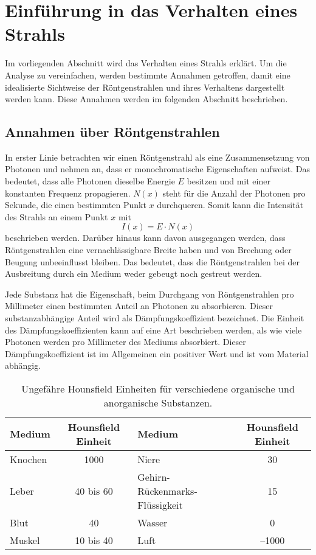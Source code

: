 %
%
%
%
\section{Einführung in das Verhalten eines Strahls
	\label{ct:section:EinführungEinesStrahls}}
Im vorliegenden Abschnitt wird das Verhalten eines Strahls erklärt. Um die Analyse zu vereinfachen, werden bestimmte Annahmen getroffen, damit eine idealisierte Sichtweise der Röntgenstrahlen und ihres Verhaltens dargestellt werden kann. Diese Annahmen werden im folgenden Abschnitt beschrieben.

\subsection{Annahmen über Röntgenstrahlen
	\label{ct:subsection:annahmen}}
In erster Linie betrachten wir einen Röntgenstrahl als eine Zusammensetzung von Photonen und nehmen an, dass er monochromatische Eigenschaften aufweist. Das bedeutet, dass alle Photonen dieselbe Energie $E$ besitzen und mit einer konstanten Frequenz propagieren. $N(x)$ steht für die Anzahl der Photonen pro Sekunde, die einen bestimmten Punkt $x$ durchqueren. Somit kann die Intensität des Strahls an einem Punkt $x$ mit
%
\begin{equation}
	I(x) = E\cdot N(x)
\end{equation}
beschrieben werden. Darüber hinaus kann davon ausgegangen werden, dass Röntgenstrahlen eine vernachlässigbare Breite haben und von Brechung oder Beugung unbeeinflusst bleiben. Das bedeutet, dass die Röntgenstrahlen bei der Ausbreitung durch ein Medium weder gebeugt noch gestreut werden.

Jede Substanz hat die Eigenschaft, beim Durchgang von Röntgenstrahlen pro Millimeter einen bestimmten Anteil an Photonen zu absorbieren. Dieser substanzabhängige Anteil wird als Dämpfungskoeffizient bezeichnet. Die Einheit des Dämpfungskoeffizienten kann auf eine Art beschrieben werden, als \glqq wie viele Photonen werden pro Millimeter des Mediums absorbiert\grqq. Dieser Dämpfungskoeffizient ist im Allgemeinen ein positiver Wert und ist vom Material abhängig.  
\begin{table}
	\centering
	\begin{tabular}{|>{}l<{}|>{}c<{}|| >{}l<{}| >{}c<{}|}
		\hline
		Medium &  Hounsfield Einheit & Medium &  Hounsfield Einheit\\
		\hline
		Knochen & 1000		& Niere & 30\\
		Leber 	& 40 bis 60	& Gehirn-Rückenmarks-Flüssigkeit & 15\\
		Blut 	& 40		& Wasser & 0\\
		Muskel 	& 10 bis 40 & Luft & --1000\\
		\hline
	\end{tabular}
	\caption{Ungefähre Hounsfield Einheiten für verschiedene organische und anorganische Substanzen.
		\label{ct:hounsfieldunits}}
\end{table}

